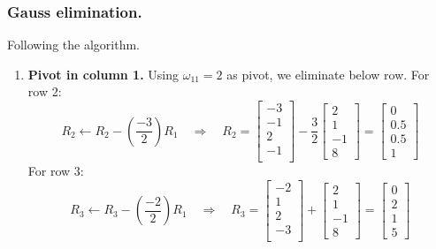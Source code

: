 \documentclass[../../../main.tex]{subfiles}
\begin{document}
\subsubsection{Gauss elimination.}
Following the algorithm.
\begin{enumerate}
    \item \textbf{Pivot in column 1.}
          Using $\omega_{11} = 2$ as pivot, we eliminate below row.
          For row 2:
          \begin{equation*}
              R_2 \leftarrow R_2 - \left(\frac{-3}{2}\right)R_1 \quad \Rightarrow \quad
              R_2=
              \begin{bmatrix}
                  -3 \\-1\\2\\-1\\
              \end{bmatrix}
              - \frac{3 }{2}
              \begin{bmatrix}
                  2 \\1\\-1\\8
              \end{bmatrix}
              =
              \begin{bmatrix}
                  0 \\ 0.5 \\ 0.5 \\ 1
              \end{bmatrix}
          \end{equation*}
          For row 3:
          \begin{equation*}
              R_3 \leftarrow R_3 - \left(\frac{-2}{2}\right)R_1 \quad \Rightarrow \quad
              R_3=
              \begin{bmatrix}
                  -2 \\1\\2\\-3\\
              \end{bmatrix}
              +
              \begin{bmatrix}
                  2 \\1\\-1\\8
              \end{bmatrix}
              =
              \begin{bmatrix}
                  0 \\ 2 \\ 1 \\ 5

\end{bmatrix}
\end{equation*}
\end{enumerate}
\end{document}

